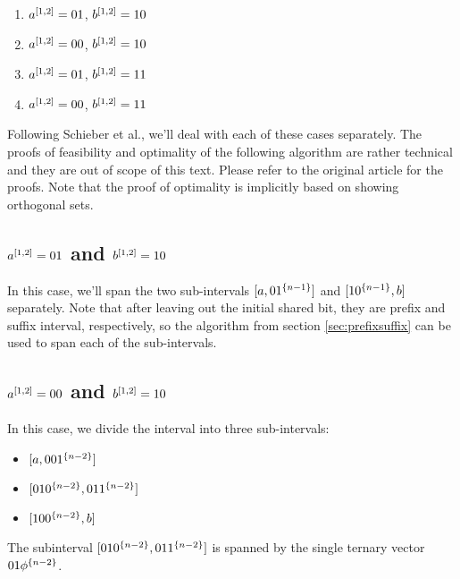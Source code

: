 \begin{enumerate}
\item $a^{[1, 2]} = 01$, $b^{[1, 2]} = 10$
\item $a^{[1, 2]} = 00$, $b^{[1, 2]} = 10$
\item $a^{[1, 2]} = 01$, $b^{[1, 2]} = 11$
\item $a^{[1, 2]} = 00$, $b^{[1, 2]} = 11$
\end{enumerate}

Following Schieber et al.,\cite{Schieber2005154}
we'll deal with each of these cases separately.
The proofs of feasibility and optimality of the following
algorithm are rather technical and they are out of scope
of this text.
Please refer to the original article for the proofs.
Note that the proof of optimality is implicitly based
on showing orthogonal sets.


\subsection{\texorpdfstring
{$a^{[1, 2]} = 01$ and $b^{[1, 2]} = 10$}
{a[1,2] = 01 and b[1,2] = 10}
}

In this case,
we'll span the two sub-intervals
$[a, 0 1^{\{n-1\}}]$
and
$[1 0^{\{n-1\}}, b]$
separately.
Note that after leaving out the initial shared bit,
they are prefix and suffix interval, respectively,
so the algorithm from section \ref{sec:prefixsuffix}
can be used to span each of the sub-intervals.

\subsection{\texorpdfstring
{$a^{[1, 2]} = 00$ and $b^{[1, 2]} = 10$}
{a[1,2] = 00 and b[1,2] = 10}
}
\label{sec:0010}

In this case,
we divide the interval into three sub-intervals:

\begin{itemize}
\item $[a, 00 1^{\{n-2\}}]$
\item $[01 0^{\{n-2\}}, 01 1^{\{n-2\}}]$
\item $[10 0^{\{n-2\}}, b]$
\end{itemize}

The subinterval
$[01 0^{\{n-2\}}, 01 1^{\{n-2\}}]$
is spanned by the single ternary vector
$01 \phi^{\{n-2\}}$.

